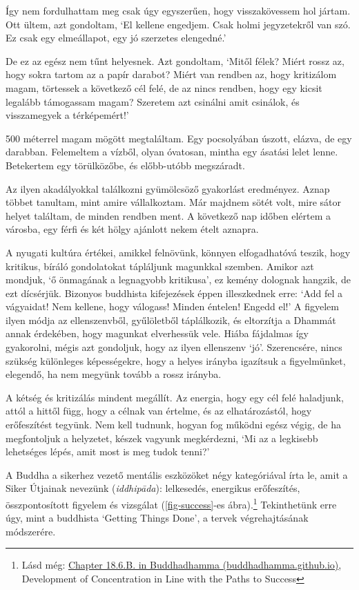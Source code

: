Így nem fordulhattam meg csak úgy egyszerűen, hogy visszakövessem hol
jártam. Ott ültem, azt gondoltam, `El kellene engedjem. Csak holmi
jegyzetekről van szó. Ez csak egy elmeállapot, egy jó szerzetes
elengedné.'

De ez az egész nem tűnt helyesnek. Azt gondoltam, `Mitől félek? Miért
rossz az, hogy sokra tartom az a papír darabot? Miért van rendben az,
hogy kritizálom magam, törtessek a következő cél felé, de az nincs
rendben, hogy egy kicsit legalább támogassam magam? Szeretem azt
csinálni amit csinálok, és visszamegyek a térképemért!'

500 méterrel magam mögött megtaláltam. Egy pocsolyában úszott, elázva,
de egy darabban. Felemeltem a vízből, olyan óvatosan, mintha egy ásatási
lelet lenne. Betekertem egy törülközőbe, és előbb-utóbb megszáradt.

Az ilyen akadályokkal találkozni gyümölcsöző gyakorlást eredményez.
Aznap többet tanultam, mint amire vállalkoztam. Már majdnem sötét volt,
mire sátor helyet találtam, de minden rendben ment. A következő nap
időben elértem a városba, egy férfi és két hölgy ajánlott nekem ételt
aznapra.

A nyugati kultúra értékei, amikkel felnövünk, könnyen elfogadhatóvá
teszik, hogy kritikus, bíráló gondolatokat tápláljunk magunkkal szemben.
Amikor azt mondjuk, `ő önmagának a legnagyobb kritikusa', ez kemény
dolognak hangzik, de ezt dícsérjük. Bizonyos buddhista kifejezések éppen
illeszkednek erre: `Add fel a vágyaidat! Nem kellene, hogy válogass!
Minden éntelen! Engedd el!' A figyelem ilyen módja az ellenszenvből,
gyűlöletből táplálkozik, és eltorzítja a Dhammát annak érdekében, hogy
magunkat elverhessük vele. Hiába fájdalmas így gyakorolni, mégis azt
gondoljuk, hogy az ilyen ellenszenv `jó'. Szerencsére, nincs szükség
különleges képességekre, hogy a helyes irányba igazítsuk a figyelmünket,
elegendő, ha nem megyünk tovább a rossz irányba.


A kétség és kritizálás mindent megállít. Az energia, hogy egy cél felé
haladjunk, attól a hittől függ, hogy a célnak van értelme, és az
elhatározástól, hogy erőfeszítést tegyünk. Nem kell tudnunk, hogyan fog
működni egész végig, de ha megfontoljuk a helyzetet, készek vagyunk
megkérdezni, `Mi az a legkisebb lehetséges lépés, amit most is meg tudok
tenni?'

A Buddha a sikerhez vezető mentális eszközöket négy kategóriával írta
le, amit a Siker Útjainak nevezünk (\emph{iddhipāda}): lelkesedés,
energikus erőfeszítés, összpontosított figyelem és vizsgálat
(\ref{fig-success}-es ábra).\footnote{Lásd még:
  \href{https://buddhadhamma.github.io/path-factors-of-concentration.html\#development-of-concentration-in-line-with-the-paths-to-success}{Chapter
  18.6.B. in Buddhadhamma (buddhadhamma.github.io)}, Development of
  Concentration in Line with the Paths to Success} Tekinthetünk erre
úgy, mint a buddhista `Getting Things Done', a tervek végrehajtásának
módszerére.


